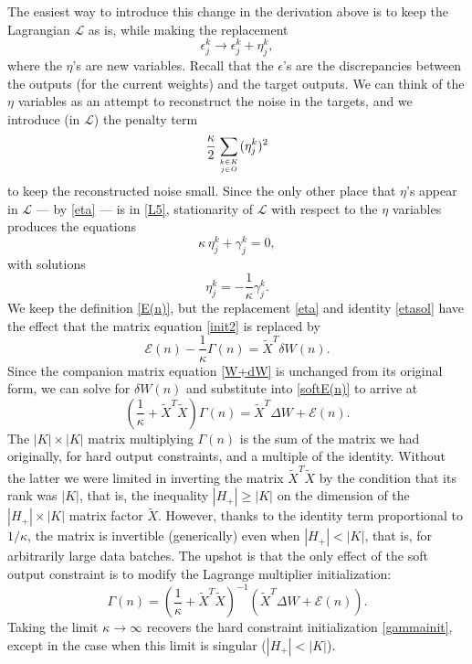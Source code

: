\documentclass[12pt]{article}
\begin{document}
The easiest way to introduce this change in the derivation above is to keep the Lagrangian $\mathcal{L}$ as is, while making the replacement
\begin{equation}\label{eta}
\epsilon^k_j\to \epsilon^k_j+\eta^k_j,
\end{equation}
where the $\eta$'s are new variables. Recall that the $\epsilon$'s are the discrepancies between the outputs (for the current weights) and the target outputs. We can think of the $\eta$ variables as an attempt to reconstruct the noise in the targets, and we introduce (in $\mathcal{L}$) the penalty term
\begin{equation}
\frac{\kappa}{2} \sum_{{k\in K}\atop{j\in O}} (\eta^k_j)^2
\end{equation}
to keep the reconstructed noise small. Since the only other place that $\eta$'s appear in $\mathcal{L}$ --- by \eqref{eta} --- is in \eqref{L5}, stationarity of $\mathcal{L}$ with respect to the $\eta$ variables produces the equations
\begin{equation}
\kappa\, \eta^k_j+\gamma^k_j=0,
\end{equation}
with solutions
\begin{equation}\label{etasol}
\eta^k_j=-\frac{1}{\kappa}\gamma^k_j.
\end{equation}
We keep the definition \eqref{E(n)}, but the replacement \eqref{eta} and identity \eqref{etasol} have the effect that the matrix equation \eqref{init2} is replaced by
\begin{equation}\label{softE(n)}
\mathcal{E}(n)-\frac{1}{\kappa}\Gamma(n)=\widetilde{X}^T \delta W(n).
\end{equation}
Since the companion matrix equation \eqref{W+dW} is unchanged from its original form, we can solve for $\delta W(n)$ and substitute into \eqref{softE(n)} to arrive at
\begin{equation}
\left(\frac{1}{\kappa}+\widetilde{X}^T \widetilde{X}\right)\Gamma(n)=\widetilde{X}^T\Delta W+\mathcal{E}(n).
\end{equation}
The $|K|\times |K|$ matrix multiplying $\Gamma(n)$ is the sum of the matrix we had originally, for hard output constraints, and a multiple of the identity. Without the latter we were limited in inverting the matrix $\widetilde{X}^T\widetilde{X}$ by the condition that its rank was $|K|$, that is, the inequality $|H_+|\ge |K|$ on the dimension of the $|H_+|\times |K|$ matrix factor $\widetilde{X}$. However, thanks to the identity term proportional to $1/\kappa$, the matrix is invertible (generically) even when $|H_+|< |K|$, that is, for arbitrarily large data batches. The upshot is that the only effect of the soft output constraint is to modify the Lagrange multiplier initialization:
\begin{equation}
\Gamma(n)=\left(\frac{1}{\kappa}+\widetilde{X}^T \widetilde{X}\right)^{-1}\left(\widetilde{X}^T\Delta W+\mathcal{E}(n)\right).
\end{equation}
Taking the limit $\kappa\to\infty$ recovers the hard constraint initialization \eqref{gammainit}, except in the case when this limit is singular ($|H_+|< |K|$).
\end{document}
